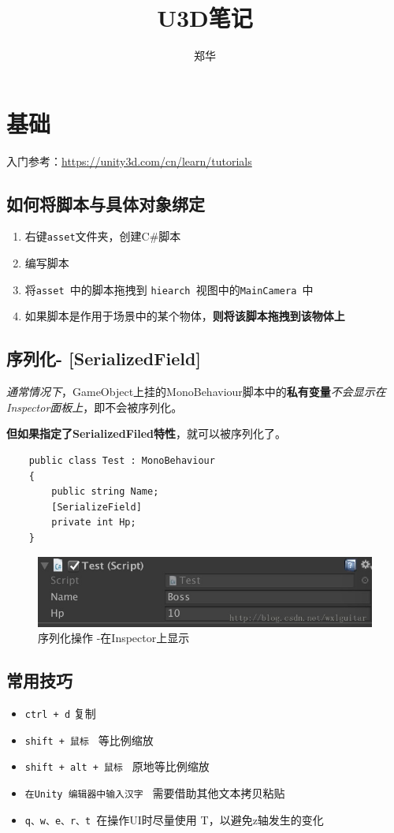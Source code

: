 \documentclass[UTF8,a4paper,12pt]{ctexbook}
\author{\kaishu 郑华}
\title{\heiti U3D笔记}
\begin{document}
 	\maketitle
 	\tableofcontents

\chapter{基础}
	入门参考：\url{https://unity3d.com/cn/learn/tutorials}
	
	\section{如何将脚本与具体对象绑定}
		\begin{enumerate}
			\item 右键\verb|asset|文件夹，创建C\#脚本
			\item 编写脚本
			\item 将\verb|asset |中的脚本拖拽到 \verb|hiearch |视图中的\verb|MainCamera |中
			\item 如果脚本是作用于场景中的某个物体，\textbf{则将该脚本拖拽到该物体上}
		\end{enumerate}
	
	\section{序列化-  [SerializedField]}
		\textit{通常情况下}，GameObject上挂的MonoBehaviour脚本中的\textbf{私有变量}\textit{不会显示在Inspector面板上}，即不会被序列化。
		
		\textbf{但如果指定了SerializedFiled特性}，就可以被序列化了。
		
		\begin{lstlisting}
	public class Test : MonoBehaviour 
	{
		public string Name;
		[SerializeField]
		private int Hp; 
	}
		\end{lstlisting}
		
		\begin{figure}[H]
			\centering
			\includegraphics[scale=0.8]{SerilizedFiled.jpg}
			\caption{序列化操作 -在Inspector上显示}
		\end{figure}
	
	\section{常用技巧}
		\begin{itemize}
			\item \verb|ctrl + d| 复制
			\item \verb|shift + 鼠标 | 等比例缩放 
			\item \verb|shift + alt + 鼠标 | 原地等比例缩放
			\item \verb|在Unity 编辑器中输入汉字 | 需要借助其他文本拷贝粘贴
			\item \verb|q、w、e、r、t |在操作UI时尽量使用 T，以避免z轴发生的变化 
		\end{itemize}
	
\end{document}
